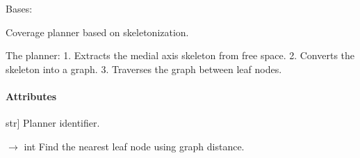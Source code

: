 \documentclass[letterpaper,10pt,english]{sphinxmanual}
\begin{document}

\begin{fulllineitems}
\label{\detokenize{mirte_lc_nav2.navigators:mirte_lc_nav2.navigators.SkeletonPath}}
\pysigstartsignatures
\pysiglinewithargsret
{}
{\sphinxparamcomma {}}
{}
\pysigstopsignatures
\sphinxAtStartPar
Bases: {\hyperref[\detokenize{mirte_lc_nav2.navigator_types:mirte_lc_nav2.navigator_types.SystematicNavigator}]{}}

\sphinxAtStartPar
Coverage planner based on skeletonization.

\sphinxAtStartPar
The planner:
1. Extracts the medial axis skeleton from free space.
2. Converts the skeleton into a graph.
3. Traverses the graph between leaf nodes.


\paragraph{Attributes}
\label{\detokenize{mirte_lc_nav2.navigators:id7}}\begin{description}
\sphinxlineitem{name}{[}str{]}
\sphinxAtStartPar
Planner identifier.

\end{description}

\begin{fulllineitems}
\label{\detokenize{mirte_lc_nav2.navigators:mirte_lc_nav2.navigators.SkeletonPath.find_nearest_leaf_node_along_path}}
\pysigstartsignatures
\pysiglinewithargsret
{}
{\sphinxparamcomma {}\sphinxparamcomma {}}
{{ $\rightarrow$ int}}
\pysigstopsignatures
\sphinxAtStartPar
Find the nearest leaf node using graph distance.



\end{fulllineitems}
\end{fulllineitems}
\end{document}
